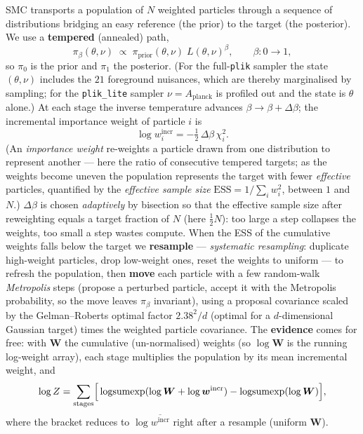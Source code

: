 \documentclass[11pt]{article}
\newcommand{\code}[1]{\texttt{\small #1}}
\newcommand{\chisq}{\chi^2}
\begin{document}
SMC transports a population of $N$ weighted particles through a sequence
of distributions bridging an easy reference (the prior) to the target
(the posterior). We use a \textbf{tempered} (annealed) path,
\begin{equation}
\pi_\beta(\theta,\nu)\;\propto\;\pi_{\mathrm{prior}}(\theta,\nu)\;
L(\theta,\nu)^{\beta},\qquad \beta:0\to1,
\end{equation}
so $\pi_0$ is the prior and $\pi_1$ the posterior. (For the
full-\code{plik} sampler the state $(\theta,\nu)$ includes the $21$
foreground nuisances, which are thereby marginalised by sampling; for the
\code{plik\_lite} sampler $\nu=A_{\mathrm{planck}}$ is profiled out and
the state is $\theta$ alone.) At each stage the inverse temperature
advances $\beta\to\beta+\Delta\beta$; the incremental importance weight of
particle $i$ is
\begin{equation}
\log w^{\mathrm{incr}}_i=-\tfrac12\,\Delta\beta\,\chisq_i .
\end{equation}
(An \emph{importance weight} re-weights a particle drawn from one
distribution to represent another --- here the ratio of consecutive
tempered targets; as the weights become uneven the population represents
the target with fewer \emph{effective} particles, quantified by the
\emph{effective sample size} $\mathrm{ESS}=1/\sum_i w_i^2$, between $1$ and
$N$.)
$\Delta\beta$ is chosen \emph{adaptively} by bisection so that the
effective sample size after reweighting equals a target fraction of $N$
(here $\tfrac12N$): too large a step collapses the weights, too small a
step wastes compute. When the ESS of the cumulative weights falls below
the target we \textbf{resample} --- \emph{systematic resampling}: duplicate
high-weight particles, drop low-weight ones, reset the weights to uniform
--- to refresh the population, then \textbf{move} each particle with a few
random-walk \emph{Metropolis} steps (propose a perturbed particle, accept
it with the Metropolis probability, so the move leaves $\pi_\beta$
invariant), using a proposal covariance scaled by the Gelman--Roberts
optimal factor $2.38^2/d$ (optimal for a $d$-dimensional Gaussian target)
times the weighted particle covariance. The
\textbf{evidence} comes for free: with $\bm W$ the cumulative
(un-normalised) weights (so $\log\bm W$ is the running log-weight array),
each stage multiplies the population by its mean incremental weight, and
\begin{equation}
\log Z=\sum_{\mathrm{stages}}\Bigl[\,
\mathrm{logsumexp}(\log\bm W+\log\bm w^{\mathrm{incr}})
-\mathrm{logsumexp}(\log\bm W)\Bigr],
\label{eq:logz}
\end{equation}
where the bracket reduces to $\log\overline{w^{\mathrm{incr}}}$ right after
a resample (uniform $\bm W$).
\end{document}
